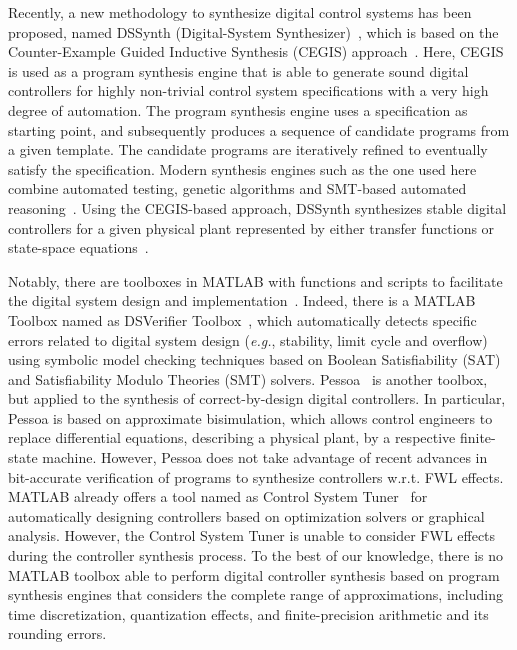\documentclass[10pt,conference]{IEEEtran}
\begin{document}
Recently, a new methodology to synthesize digital control systems has been proposed, 
named DSSynth (Digital-System Synthesizer)~\cite{abate2017, abatecav2017}, 
which is based on the Counter-Example Guided Inductive Synthesis 
(CEGIS) approach~\cite{DBLP:conf/asplos/Solar-LezamaTBSS06}. Here, CEGIS is used
as a program synthesis engine that is able to generate sound digital controllers for highly non-trivial 
control system specifications with a very high degree of automation. The program synthesis engine 
uses a specification as starting point, and subsequently produces a sequence of candidate 
programs from a given template. The candidate programs are iteratively refined to eventually 
satisfy the specification. Modern synthesis engines such as the one used here combine automated testing, genetic algorithms 
and SMT-based automated reasoning~\cite{DBLP:journals/corr/AlurFSS16a, DBLP:conf/lpar/DavidKL15}. 
Using the CEGIS-based approach, DSSynth synthesizes stable digital controllers
for a given physical plant represented by either transfer functions or state-space equations~\cite{abate2017,abatecav2017}.

Notably, there are toolboxes in MATLAB with functions and scripts to facilitate the 
digital system design and implementation~\cite{matlab-toolbox}. Indeed, there is a MATLAB 
Toolbox named as DSVerifier Toolbox~\cite{issta2017}, which automatically detects 
specific errors related to digital system design ({\it e.g.}, stability, limit cycle and overflow) 
using symbolic model checking techniques based on Boolean Satisfiability (SAT) and 
Satisfiability Modulo Theories (SMT) solvers. Pessoa~\cite{mazo2010pessoa} is another 
toolbox, but applied to the synthesis of correct-by-design digital controllers. 
In particular, Pessoa is based on approximate bisimulation, which allows control engineers to replace differential equations, 
describing a physical plant, by a respective finite-state machine. However, Pessoa does not take advantage of
recent advances in bit-accurate verification of programs to synthesize controllers w.r.t. FWL effects. MATLAB already offers a tool 
named as Control System Tuner~\cite{autotuner} for automatically designing controllers based on optimization solvers or graphical analysis. 
However, the Control System Tuner is unable to consider FWL effects during the controller synthesis process.
To the best of our knowledge, there is no MATLAB toolbox able to perform digital controller synthesis based on 
program synthesis engines that considers the complete range of approximations, including time discretization, 
quantization effects, and finite-precision arithmetic and its rounding errors. 
\end{document}
